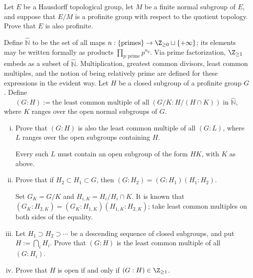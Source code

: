 
\begin{Exercises}
	\item Let $E$ be a Hausdorff topological group, let $M$ be a finite normal subgroup of $E$, and suppose that $E/M$ is a profinite group with respect to the quotient topology. Prove that $E$ is also profinite.

	\item Define $\hat{\mathbb{N}}$ to be the set of all maps $n:\{\text{primes}\}\to\Z_{\geq 0}\sqcup\{+\infty\}$; its elements may be written formally as products $\prod_{p:\text{prime}}p^{n_p}$. Via prime factorization, $\Z_{\geq 1}$ embeds as a subset of $\hat{\mathbb{N}}$. Multiplication, greatest common divisors, least common multiples, and the notion of being relatively prime are defined for these expressions in the evident way. Let $H$ be a closed subgroup of a profinite group $G$. Define
	\[ (G:H) := \text{the least common multiple of all}\; (G/K : H/(H \cap K)) \;\text{in $\hat{\mathbb{N}}$}, \]
	where $K$ ranges over the open normal subgroups of $G$.
	\begin{enumerate}[(i)]
		\item Prove that $(G:H)$ is also the least common multiple of all $(G:L)$, where $L$ ranges over the open subgroups containing $H$.
		\begin{hint}
			Every such $L$ must contain an open subgroup of the form $HK$, with $K$ as above.
		\end{hint}
		\item Prove that if $H_2\subset H_1\subset G$, then $(G:H_2)=(G:H_1)(H_1:H_2)$.

		\begin{hint}
			Set $G_K=G/K$ and $H_{i,K}=H_i/H_i\cap K$. It is known that $(G_K:H_{2,K})=(G_K:H_{1,K})(H_{1,K}:H_{2,K})$; take least common multiples on both sides of the equality.
		\end{hint}
		\item Let $H_1\supset H_2\supset\cdots$ be a descending sequence of closed subgroups, and put $H:=\bigcap_iH_i$. Prove that $(G:H)$ is the least common multiple of all $(G:H_i)$.
		\item Prove that $H$ is open if and only if $(G:H)\in\Z_{\geq 1}$.
	\end{enumerate}


\end{Exercises}
